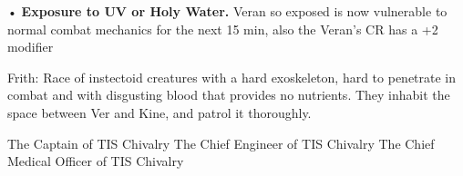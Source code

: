 \documentclass[blue]{guildcamp4}
\begin{document}
•	{\bf Exposure to UV or Holy Water.} Veran so exposed is now vulnerable to normal combat mechanics for the next 15 min, also the Veran's CR has a +2 modifier

Frith: Race of instectoid creatures with a hard exoskeleton, hard to penetrate in combat and with disgusting blood that provides no nutrients. They inhabit the space between Ver and Kine, and patrol it thoroughly.






\begin{members}
	\member{\cVone{}} The Captain of TIS Chivalry
	\member{\cVtwo{}} The Chief Engineer of TIS Chivalry
	\member{\cVthree{}} The Chief Medical Officer of TIS Chivalry

\end{members}
\end{document}
